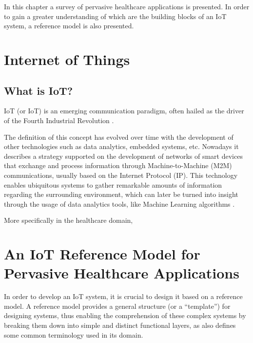 In this chapter a survey of pervasive healthcare applications is presented. In order to gain a greater understanding of which are the building blocks of an \acf{IoT} system, a reference model is also presented.


\section{Internet of Things}

\subsection{What is IoT?}

\acl{IoT} (or \acs{IoT}) is an emerging communication paradigm, often hailed as the driver of the Fourth Industrial Revolution \cite{Aceto2020}. \bigskip

The definition of this concept has evolved over time with the development of other technologies such as data analytics, embedded systems, etc. Nowadays it describes a strategy supported on the development of networks of smart devices that exchange and process information through Machine-to-Machine (M2M) communications, usually based on the Internet Protocol (IP). This technology enables ubiquitous systems to gather remarkable amounts of information regarding the surrounding environment, which can later be turned into insight through the usage of data analytics tools, like Machine Learning algorithms \cite{Singh2019}. \bigskip

More specifically in the healthcare domain, 


\section{An IoT Reference Model for Pervasive Healthcare Applications}

In order to develop an IoT system, it is crucial to design it based on a reference model. A reference model provides a general structure (or a ``template'') for designing systems, thus enabling the comprehension of these complex systems by breaking them down into simple and distinct functional layers, as also defines some common terminology used in its domain.\bigskip

